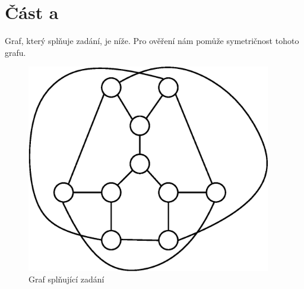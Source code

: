 \documentclass{fkssolpub}
\author{Ondřej Sedláček}
\begin{document}
\section{Část a}

Graf, který splňuje zadání, je níže. Pro ověření nám pomůže symetričnost tohoto
grafu.

\begin{figure}[h!]
	\begin{center}
		\includegraphics[width=0.95\textwidth]{6-fig}
	\end{center}
	\caption{Graf splňující zadání}
	\label{fig:}
\end{figure}
\end{document}
